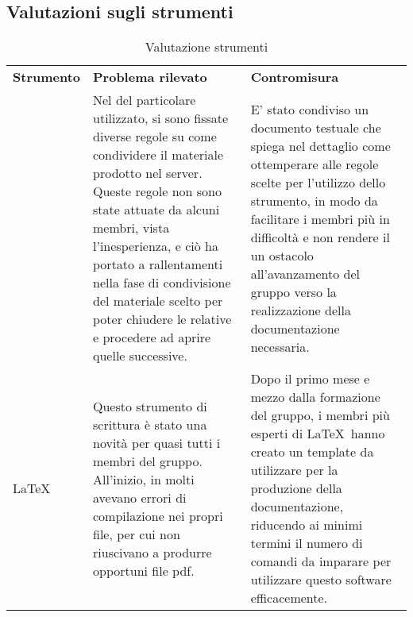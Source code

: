 \subsection{Valutazioni sugli strumenti}
\begin{table} [h!]
	\begin{center}
		\begin{tabular} { m{2cm} m{7cm} m{} }
			\rowcolor{lightgray}
			\textbf{Strumento} & \textbf{Problema rilevato} & \textbf{Contromisura}\\
			\glock{Version Control System} & Nel \glock{workflow} del particolare \glock{VCS} utilizzato, si sono fissate diverse regole su come condividere il materiale prodotto nel server. Queste regole non sono state attuate da alcuni membri, vista l’inesperienza, e ciò ha portato a rallentamenti nella fase di condivisione del materiale scelto per poter chiudere le \glock{milestone} relative e procedere ad aprire quelle successive. & E’ stato condiviso un documento testuale che spiega nel dettaglio come ottemperare alle regole scelte per l’utilizzo dello strumento, in modo da facilitare i membri più in difficoltà e non rendere il \glock{VCS} un ostacolo all'avanzamento del gruppo verso la realizzazione della documentazione necessaria. \\
			\LaTeX\ &	Questo strumento di scrittura è stato una novità per quasi tutti i membri del gruppo. All'inizio, in molti avevano errori di compilazione nei propri file, per cui non riuscivano a produrre opportuni file pdf. & Dopo il primo mese e mezzo dalla formazione del gruppo, i membri più esperti di \LaTeX\ hanno creato un template da utilizzare per la produzione della documentazione, riducendo ai minimi termini il numero di comandi da imparare per utilizzare questo software efficacemente.
		\end{tabular}
	\end{center}
\caption{Valutazione strumenti}
\end{table}
